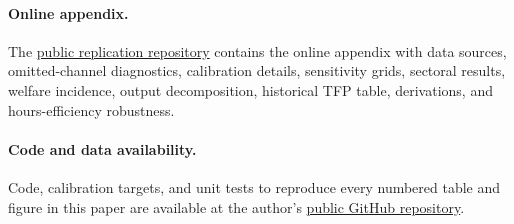 \documentclass[12pt,a4paper]{article}
\newcommand{\onlineappendixurl}{https://github.com/vr-rodrigues/jornada-6x1-replication}
\begin{document}





\paragraph{Online appendix.} The \href{\onlineappendixurl}{public replication repository} contains the online appendix with data sources, omitted-channel diagnostics, calibration details, sensitivity grids, sectoral results, welfare incidence, output decomposition, historical TFP table, derivations, and hours-efficiency robustness.

\paragraph{Code and data availability.} Code, calibration targets, and unit tests to reproduce every numbered table and figure in this paper are available at the author's \href{https://github.com/vr-rodrigues/jornada-6x1-replication}{public GitHub repository}.



\end{document}
